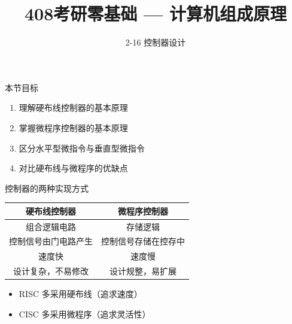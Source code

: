 \documentclass[10pt, aspectratio=169]{beamer}
\title{408考研零基础 --- 计算机组成原理}
\subtitle{2-16 控制器设计}
\author{}
\date{}
\begin{document}
\begin{frame}{本节目标}
    \begin{enumerate}
        \item 理解硬布线控制器的基本原理
        \item 掌握微程序控制器的基本原理
        \item 区分水平型微指令与垂直型微指令
        \item 对比硬布线与微程序的优缺点
    \end{enumerate}
\end{frame}

\begin{frame}{控制器的两种实现方式}
    \begin{center}
        \begin{tabular}{|c|c|}
            \hline
            \textbf{硬布线控制器} & \textbf{微程序控制器} \\
            \hline
            组合逻辑电路 & 存储逻辑 \\
            控制信号由门电路产生 & 控制信号存储在控存中 \\
            速度快 & 速度慢 \\
            设计复杂，不易修改 & 设计规整，易扩展 \\
            \hline
        \end{tabular}
    \end{center}
    \vspace{0.5em}
    \begin{itemize}
        \item RISC 多采用硬布线（追求速度）
        \item CISC 多采用微程序（追求灵活性）
    \end{itemize}
\end{frame}
\end{document}
